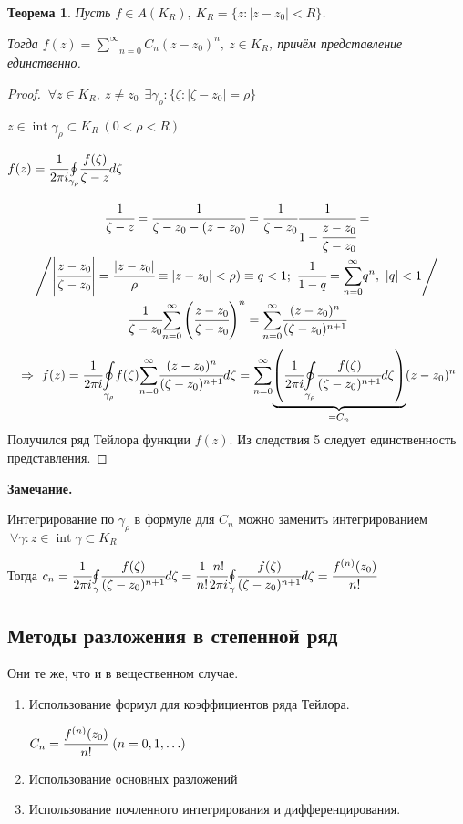 \documentclass[draft]{article}
\renewcommand{\bf}{\bfseries}
\newcommand{\then}{\ \Rightarrow\ }
\newcommand{\moint}[1]{\underset{#1}{\oint}}
\newcommand{\msum}[2]{\underset{#1}{\overset{#2}{\sum}}}
\newcommand{\ssum}{\msum{n=0}{\infty}}
\newcommand{\Int}{\mathop{\mathrm{int}}\nolimits}
\newcommand{\g}{\gamma}
\newcommand{\E}{\ \exists}
\newcommand{\F}{\ \forall}
\newtheorem*{theor}{Теорема}
\theoremstyle{remark}
\begin{document}
\begin{theor}
Пусть $f\in A(K_R),\ K_R=\{z\colon|z-z_0|<R\}$.

Тогда $f(z)=\ssum C_n(z-z_0)^n,\ z\in K_R$, причём представление единственно.
\end{theor}
\begin{proof}
$\F z\in K_R,\ z\neq z_0\ \E \g_\rho\colon\{\zeta\colon|\zeta-z_0|=\rho\}$

$z\in\Int\g_\rho\subset K_R\ (0<\rho<R)$

$f(z)=\cfrac1{2\pi i}\moint{\g_\rho}\cfrac{f(\zeta)}{\zeta-z}d\zeta$

\begin{multline*}
\cfrac1{\zeta-z}=\cfrac1{\zeta-z_0-(z-z_0)}=\cfrac1{\zeta-z_0}\cfrac1{1-\cfrac{z-z_0}{\zeta-z_0}}=\\
\left/\left|\cfrac{z-z_0}{\zeta-z_0}\right|=\cfrac{|z-z_0|}{\rho}\equiv|z-z_0|<\rho)\equiv q<1;\ \cfrac1{1-q}=\ssum q^n,\ |q|<1\right/\\
\cfrac1{\zeta-z_0}\ssum\left(\cfrac{z-z_0}{\zeta-z_0}\right)^n=\ssum\cfrac{(z-z_0)^n}{(\zeta-z_0)^{n+1}}
\end{multline*}
$$
\then f(z)=\cfrac1{2\pi i}\moint{\g_\rho}f(\zeta)\ssum\cfrac{(z-z_0)^n}{(\zeta-z_0)^{n+1}}d\zeta=\ssum\underset{=C_n}{\underbrace{\left(\cfrac1{2\pi i}\moint{\g_\rho}\cfrac{f(\zeta)}{(\zeta-z_0)^{n+1}}d\zeta\right)}}(z-z_0)^n
$$
Получился ряд Тейлора функции $f(z)$. Из следствия 5 следует единственность представления.
\end{proof}
{\bf Замечание.}

Интегрирование по $\g_\rho$ в формуле для $C_n$ можно заменить интегрированием $\F \g\colon z\in\Int\g\subset K_R$

Тогда $c_n=\cfrac1{2\pi i}\moint{\g}\cfrac{f(\zeta)}{(\zeta-z_0)^{n+1}}d\zeta=\cfrac1{n!}\cfrac{n!}{2\pi i}\moint{\g}\cfrac{f(\zeta)}{(\zeta-z_0)^{n+1}}d\zeta=\cfrac{f^{(n)}(z_0)}{n!}$

\subsection{Методы разложения в степенной ряд}

Они те же, что и в вещественном случае.
\begin{enumerate}
\item Использование формул для коэффициентов ряда Тейлора.

$C_n=\cfrac{f^{(n)}(z_0)}{n!}\ (n=0,1,\ldots)$
\item Использование основных разложений
\item Использование почленного интегрирования и дифференцирования.
\end{enumerate}
\end{document}
